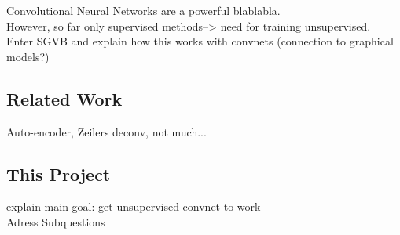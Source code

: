Convolutional Neural Networks are a powerful blablabla. \\
However, so far only supervised methods--> need for training unsupervised. \\
Enter SGVB and explain how this works with convnets (connection to graphical models?)
\subsection{Related Work}
Auto-encoder, Zeilers deconv, not much...

\subsection{This Project}
explain main goal: get unsupervised convnet to work \\
Adress Subquestions
\newpage



